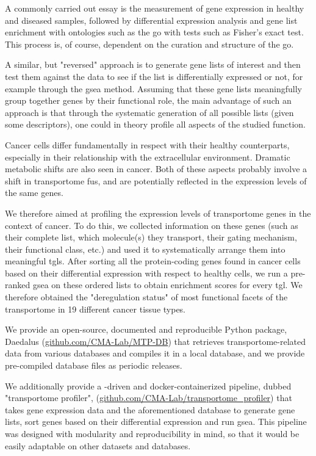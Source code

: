 A commonly carried out essay is the measurement of gene expression in healthy and diseased samples, followed by differential expression analysis and gene list enrichment with ontologies such as the \gls{go} with tests such as Fisher's exact test.
This process is, of course, dependent on the curation and structure of the \gls{go}.

A similar, but "reversed" approach is to generate gene lists of interest and then test them against the data to see if the list is differentially expressed or not, for example through the \gls{gsea} method.
Assuming that these gene lists meaningfully group together genes by their functional role, the main advantage of such an approach is that through the systematic generation of all possible lists (given some descriptors), one could in theory profile all aspects of the studied function.

Cancer cells differ fundamentally in respect with their healthy counterparts, especially in their relationship with the extracellular environment.
Dramatic metabolic shifts are also seen in cancer.
Both of these aspects probably involve a shift in transportome \glspl{fu}, and are potentially reflected in the expression levels of the same genes.

We therefore aimed at profiling the expression levels of transportome genes in the context of cancer.
To do this, we collected information on these genes (such as their complete list, which molecule(s) they transport, their gating mechanism, their functional class, etc.) and used it to systematically arrange them into meaningful \glspl{tgl}.
After sorting all the protein-coding genes found in cancer cells based on their differential expression with respect to healthy cells, we run a pre-ranked \gls{gsea} on these ordered lists to obtain enrichment scores for every \gls{tgl}.
We therefore obtained the "deregulation status" of most functional facets of the transportome in 19 different cancer tissue types.

We provide an open-source, documented and reproducible Python package, Daedalus (\href{https://github.com/CMA-Lab/MTP-DB}{github.com/CMA-Lab/MTP-DB}) that retrieves transportome-related data from various databases and compiles it in a local  database, and we provide pre-compiled database files as periodic releases.

We additionally provide a -driven and docker-containerized pipeline, dubbed "transportome profiler", (\href{https://github.com/CMA-Lab/transportome_profiler}{github.com/CMA-Lab/transportome\_profiler}) that takes gene expression data and the aforementioned database to generate gene lists, sort genes based on their differential expression and run \gls{gsea}.
This pipeline was designed with modularity and reproducibility in mind, so that it would be easily adaptable on other datasets and databases.
